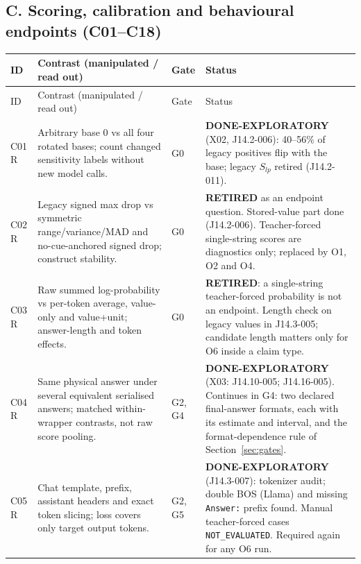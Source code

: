 \documentclass[10pt,a4paper]{article}
\newcommand{\NE}{\texttt{NOT\_EVALUATED}}
\begin{document}
\subsection{C. Scoring, calibration and behavioural endpoints (C01--C18)}
\label{sec:inv-C}

\begingroup\small
\begin{longtable}{@{}P{1.2cm}P{7.2cm}P{1.3cm}P{5.6cm}@{}}
\toprule
ID & Contrast (manipulated / read out) & Gate & Status \\
\midrule
\endfirsthead
\toprule
ID & Contrast (manipulated / read out) & Gate & Status \\
\midrule
\endhead
\bottomrule
\endfoot
C01 \newline R & Arbitrary base 0 vs all four rotated bases; count changed sensitivity labels without new model calls. & G0 &
\textbf{DONE-EXPLORATORY} (X02, J14.2-006): 40--56\% of legacy positives flip with the base; legacy $S_{lp}$ retired (J14.2-011). \\
C02 \newline R & Legacy signed max drop vs symmetric range/variance/MAD and no-cue-anchored signed drop; construct stability. & G0 &
\textbf{RETIRED} as an endpoint question. Stored-value part done (J14.2-006). Teacher-forced single-string scores are diagnostics only; replaced by O1, O2 and O4. \\
C03 \newline R & Raw summed log-probability vs per-token average, value-only and value+unit; answer-length and token effects. & G0 &
\textbf{RETIRED}: a single-string teacher-forced probability is not an endpoint. Length check on legacy values in J14.3-005; candidate length matters only for O6 inside a claim type. \\
C04 \newline R & Same physical answer under several equivalent serialised answers; matched within-wrapper contrasts, not raw score pooling. & G2, G4 &
\textbf{DONE-EXPLORATORY} (X03: J14.10-005; J14.16-005). Continues in G4: two declared final-answer formats, each with its estimate and interval, and the format-dependence rule of Section~\ref{sec:gates}. \\
C05 \newline R & Chat template, prefix, assistant headers and exact token slicing; loss covers only target output tokens. & G2, G5 &
\textbf{DONE-EXPLORATORY} (J14.3-007): tokenizer audit; double BOS (Llama) and missing \texttt{Answer:} prefix found. Manual teacher-forced cases \NE{}. Required again for any O6 run. \\

\end{longtable}
\end{document}
